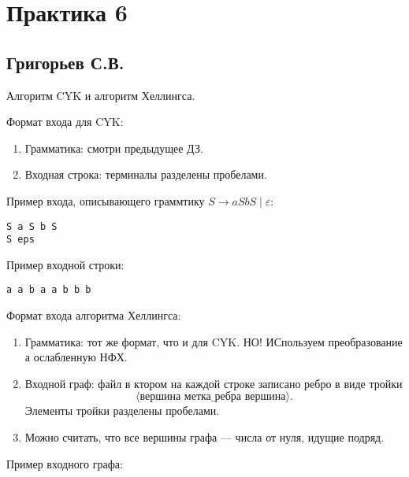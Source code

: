 \section{Практика 6}

\subsection{Григорьев С.В.}

Алгоритм CYK и алгоритм Хеллингса.

Формат входа для CYK:
\begin{enumerate}
\item Грамматика: смотри предыдущее ДЗ.
\item Входная строка: терминалы разделены пробелами.
\end{enumerate}

Пример входа, описывающего граммтику $S \to a S b S \mid \varepsilon$:

\begin{verbatim}
S a S b S
S eps 
\end{verbatim}

Пример входной строки:
\begin{verbatim}
a a b a a b b b 
\end{verbatim}


Формат входа алгоритма Хеллингса:
\begin{enumerate}
\item Грамматика: тот же формат, что и для CYK. НО! ИСпользуем преобразование а ослабленную НФХ.
\item Входной граф: файл в ктором на каждой строке записано ребро в виде тройки 
$$
\langle\textit{вершина } \textit{метка\_ребра} \textit{ вершина}\rangle.
$$
Элементы тройки разделены пробелами.
\item Можно считать, что все вершины графа --- числа от нуля, идущие подряд.
\end{enumerate}

Пример входного графа:

\begin{center}
\end{center}

